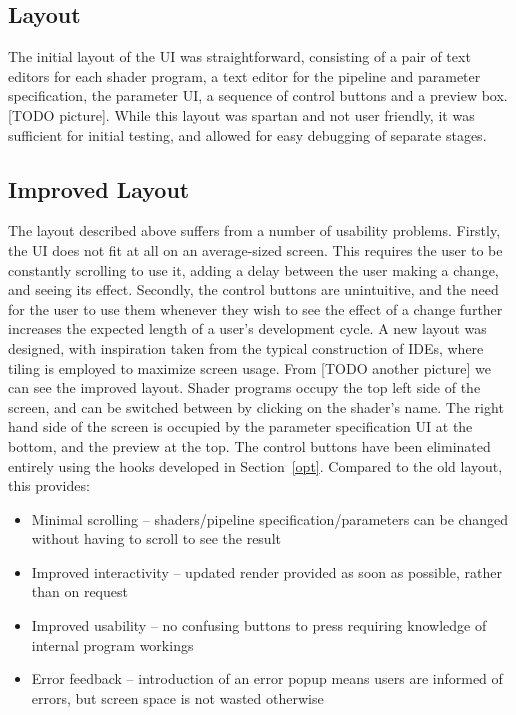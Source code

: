\documentclass[12pt,twoside,notitlepage]{report}
\begin{document}
\subsection{Layout}
The initial layout of the UI was straightforward, consisting of a pair of text editors for each shader program, a text editor for the pipeline and parameter specification, the parameter UI, a sequence of control buttons and a preview box. [TODO picture]. While this layout was spartan and not user friendly, it was sufficient for initial testing, and allowed for easy debugging of separate stages.
\subsection{Improved Layout}
The layout described above suffers from a number of usability problems. Firstly, the UI does not fit at all on an average-sized screen. This requires the user to be constantly scrolling to use it, adding a delay between the user making a change, and seeing its effect. Secondly, the control buttons are unintuitive, and the need for the user to use them whenever they wish to see the effect of a change further increases the expected length of a user's development cycle. A new layout was designed, with inspiration taken from the typical construction of IDEs, where tiling is employed to maximize screen usage. From [TODO another picture] we can see the improved layout. Shader programs occupy the top left side of the screen, and can be switched between by clicking on the shader's name. The right hand side of the screen is occupied by the parameter specification UI at the bottom, and the preview at the top. The control buttons have been eliminated entirely using the hooks developed in Section~\ref{opt}. Compared to the old layout, this provides:
\begin{itemize}
\item Minimal scrolling -- shaders/pipeline specification/parameters can be changed without having to scroll to see the result
\item Improved interactivity -- updated render provided as soon as possible, rather than on request
\item Improved usability -- no confusing buttons to press requiring knowledge of internal program workings 
\item Error feedback -- introduction of an error popup means users are informed of errors, but screen space is not wasted otherwise
\end{itemize}
\cleardoublepage
\end{document}
